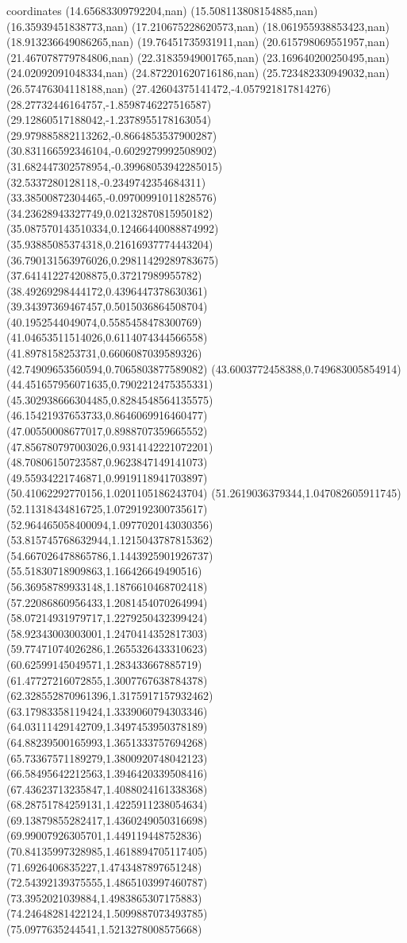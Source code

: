 coordinates {%
(14.65683309792204,nan)
(15.508113808154885,nan)
(16.35939451838773,nan)
(17.210675228620573,nan)
(18.061955938853423,nan)
(18.913236649086265,nan)
(19.76451735931911,nan)
(20.615798069551957,nan)
(21.467078779784806,nan)
(22.31835949001765,nan)
(23.169640200250495,nan)
(24.02092091048334,nan)
(24.872201620716186,nan)
(25.723482330949032,nan)
(26.57476304118188,nan)
(27.42604375141472,-4.057921817814276)
(28.27732446164757,-1.8598746227516587)
(29.12860517188042,-1.2378955178163054)
(29.979885882113262,-0.8664853537900287)
(30.831166592346104,-0.6029279992508902)
(31.682447302578954,-0.39968053942285015)
(32.5337280128118,-0.2349742354684311)
(33.38500872304465,-0.09700991011828576)
(34.23628943327749,0.02132870815950182)
(35.087570143510334,0.12466440088874992)
(35.93885085374318,0.21616937774443204)
(36.790131563976026,0.29811429289783675)
(37.641412274208875,0.37217989955782)
(38.49269298444172,0.4396447378630361)
(39.34397369467457,0.5015036864508704)
(40.1952544049074,0.5585458478300769)
(41.04653511514026,0.6114074344566558)
(41.8978158253731,0.6606087039589326)
(42.74909653560594,0.7065803877589082)
(43.6003772458388,0.749683005854914)
(44.451657956071635,0.7902212475355331)
(45.302938666304485,0.8284548564135575)
(46.15421937653733,0.8646069916460477)
(47.00550008677017,0.8988707359665552)
(47.856780797003026,0.9314142221072201)
(48.70806150723587,0.9623847149141073)
(49.55934221746871,0.9919118941703897)
(50.41062292770156,1.0201105186243704)
(51.2619036379344,1.047082605911745)
(52.11318434816725,1.0729192300735617)
(52.964465058400094,1.0977020143030356)
(53.815745768632944,1.1215043787815362)
(54.667026478865786,1.1443925901926737)
(55.51830718909863,1.166426649490516)
(56.36958789933148,1.1876610468702418)
(57.22086860956433,1.2081454070264994)
(58.07214931979717,1.2279250432399424)
(58.92343003003001,1.2470414352817303)
(59.77471074026286,1.2655326433310623)
(60.62599145049571,1.283433667885719)
(61.47727216072855,1.3007767638784378)
(62.328552870961396,1.3175917157932462)
(63.17983358119424,1.3339060794303346)
(64.03111429142709,1.3497453950378189)
(64.88239500165993,1.3651333757694268)
(65.73367571189279,1.3800920748042123)
(66.58495642212563,1.3946420339508416)
(67.43623713235847,1.4088024161338368)
(68.28751784259131,1.4225911238054634)
(69.13879855282417,1.4360249050316698)
(69.99007926305701,1.449119448752836)
(70.84135997328985,1.4618894705117405)
(71.6926406835227,1.4743487897651248)
(72.54392139375555,1.4865103997460787)
(73.3952021039884,1.4983865307175883)
(74.24648281422124,1.5099887073493785)
(75.0977635244541,1.5213278008575668)
}

